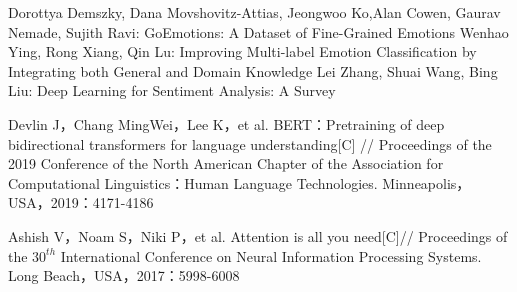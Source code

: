 \documentclass[12pt,twocolumn,letterpaper]{article}
\begin{document}
\begin{thebibliography}{99} 
\begin{enumerate}
Dorottya Demszky, Dana Movshovitz-Attias, Jeongwoo Ko,Alan Cowen, Gaurav Nemade, Sujith Ravi:  GoEmotions: A Dataset of Fine-Grained Emotions
Wenhao Ying, Rong Xiang, Qin Lu: Improving Multi-label Emotion Classification by Integrating both General and Domain Knowledge
Lei Zhang, Shuai Wang, Bing Liu: Deep Learning for Sentiment Analysis: A Survey

Devlin J，Chang MingWei，Lee K，et al. BERT：Pretraining of deep bidirectional transformers for language understanding[C] // Proceedings of the 2019 Conference of the North American Chapter of the Association for Computational Linguistics：Human Language Technologies. Minneapolis，USA，2019：4171-4186

Ashish V，Noam S，Niki P，et al. Attention is all you
need[C]// Proceedings of the $30^{th}$ International Conference on Neural Information Processing Systems. Long Beach，USA，2017：5998-6008

\end{enumerate}
\end{thebibliography}
\end{document}
